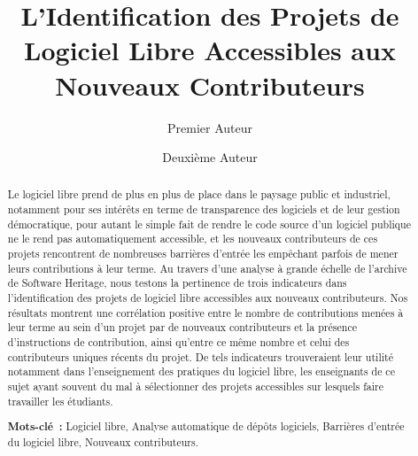 \documentclass[dvipsnames]{llncs}
\title{L'Identification des Projets de Logiciel Libre Accessibles aux Nouveaux Contributeurs}
\author{%
    Premier Auteur\inst{1}%
    \and%
    Deuxième Auteur\inst{2}%
}
\institute{Institution du premier auteur \and institution du deuxième auteur} %
\begin{document}
    \maketitle

    \begin{abstract}
        Le logiciel libre prend de plus en plus de place dans le paysage public et industriel, notamment pour
        ses intérêts en terme de transparence des logiciels et de leur gestion démocratique, pour autant le
        simple fait de rendre le code source d'un logiciel publique ne le rend pas automatiquement accessible,
        et les nouveaux contributeurs de ces projets rencontrent de nombreuses barrières d'entrée les
        empêchant parfois de mener leurs contributions à leur terme. Au travers d'une analyse à grande échelle
        de l'archive de Software Heritage, nous testons la pertinence de trois indicateurs dans
        l'identification des projets de logiciel libre accessibles aux nouveaux contributeurs. Nos résultats
        montrent une corrélation positive entre le nombre de contributions menées à leur terme au sein d'un
        projet par de nouveaux contributeurs et la présence d'instructions de contribution, ainsi qu'entre ce
        même nombre et celui des contributeurs uniques récents du projet. De tels indicateurs trouveraient
        leur utilité notamment dans l'enseignement des pratiques du logiciel libre, les enseignants de ce
        sujet ayant souvent du mal à sélectionner des projets accessibles sur lesquels faire travailler les
        étudiants.

        \textbf{Mots-clé :} Logiciel libre, Analyse automatique de dépôts logiciels, Barrières d'entrée du
        logiciel libre, Nouveaux contributeurs.
    \end{abstract}
\end{document}
